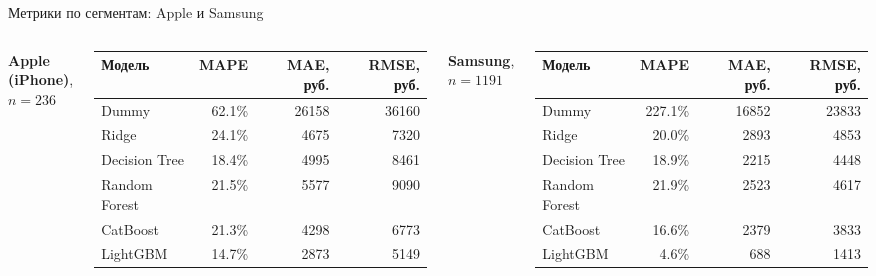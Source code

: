 \documentclass[aspectratio=169,12pt]{beamer}
\newcommand{\rub}{~руб.}
\begin{document}
\begin{frame}{Метрики по сегментам: Apple и Samsung}
  \scriptsize
  \begin{columns}[T]
    \centering
    \textbf{Apple (iPhone)}, $n=236$
    \vspace{0.3em}

    \begin{tabular}{@{}lrrr@{}}
      \toprule
      \textbf{Модель} & \textbf{MAPE} & \textbf{MAE, \rub} & \textbf{RMSE, \rub} \\
      \midrule
      Dummy & 62.1\% & 26158 & 36160 \\
      Ridge & 24.1\% & 4675 & 7320 \\
      Decision Tree & 18.4\% & 4995 & 8461 \\
      Random Forest & 21.5\% & 5577 & 9090 \\
      CatBoost & 21.3\% & 4298 & 6773 \\
      LightGBM & 14.7\% & 2873 & 5149 \\
      \bottomrule
    \end{tabular}

    \centering
    \textbf{Samsung}, $n=1191$
    \vspace{0.3em}

    \begin{tabular}{@{}lrrr@{}}
      \toprule
      \textbf{Модель} & \textbf{MAPE} & \textbf{MAE, \rub} & \textbf{RMSE, \rub} \\
      \midrule
      Dummy & 227.1\% & 16852 & 23833 \\
      Ridge & 20.0\% & 2893 & 4853 \\
      Decision Tree & 18.9\% & 2215 & 4448 \\
      Random Forest & 21.9\% & 2523 & 4617 \\
      CatBoost & 16.6\% & 2379 & 3833 \\
      LightGBM & 4.6\% & 688 & 1413 \\
      \bottomrule
    \end{tabular}
  \end{columns}

  \vspace{0.4em}
\end{frame}
\end{document}
